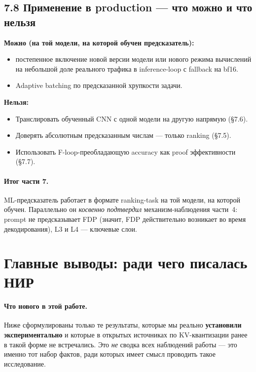\documentclass[a4paper,12pt]{article}
\begin{document}
\subsection*{7.8 Применение в production --- что можно и что нельзя}

\textbf{Можно (на той модели, на которой обучен предсказатель):}
\begin{itemize}[leftmargin=*]
\item постепенное включение новой версии модели или нового режима вычислений на небольшой доле реального трафика в inference-loop с fallback на bf16.
\item Adaptive batching по предсказанной хрупкости задачи.
\end{itemize}

\textbf{Нельзя:}
\begin{itemize}[leftmargin=*]
\item Транслировать обученный CNN с одной модели на другую напрямую (§7.6).
\item Доверять абсолютным предсказанным числам --- только ranking (§7.5).
\item Использовать F-loop-преобладающую accuracy как proof эффективности (§7.7).
\end{itemize}

\paragraph{Итог части 7.} ML-предсказатель работает в формате
ranking-task на той модели, на которой обучен. Параллельно он
\textit{косвенно подтвердил} механизм-наблюдения части~4: prompt не
предсказывает FDP (значит, FDP действительно возникает во время
декодирования), L3 и L4 --- ключевые слои.

\clearpage

\section{Главные выводы: ради чего писалась НИР}

\paragraph{Что нового в этой работе.} Ниже сформулированы только те
результаты, которые мы реально \textbf{установили экспериментально} и
которые в открытых источниках по KV-квантизации ранее в такой форме не
встречались. Это \textit{не} сводка всех наблюдений работы --- это
именно тот набор фактов, ради которых имеет смысл проводить такое
исследование.
\end{document}
